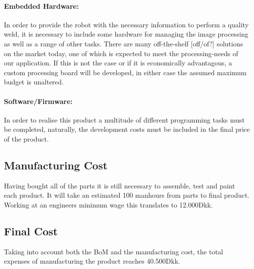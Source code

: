 \paragraph{Embedded Hardware:}
In order to provide the robot with the necessary information to perform a quality weld, it is necessary to include some hardware for managing the image processing as well as a range of other tasks. There are many off-the-shelf [off/of?] solutions on the market today, one of which is expected to meet the processing-needs of our application. If this is not the case or if it is economically advantagous, a custom processing board will be developed, in either case the assumed maximum budget is unaltered.
\paragraph{Software/Firmware:}
In order to realise this product a multitude of different programming tasks must be completed, naturally, the development costs must be included in the final price of the product.
\subsection{Manufacturing Cost}
Having bought all of the parts it is still necessary to assemble, test and paint each product. It will take an estimated 100  manhours from parts to final product. Working at an engineers minimum wage this translates to 12.000Dkk.
\subsection{Final Cost}
Taking into account both the BoM and the manufacturing cost, the total expenses of manufacturing the product reaches 40.500Dkk. 